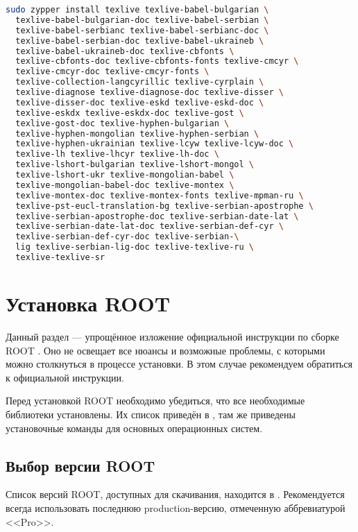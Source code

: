 \documentclass[12pt, a4paper, oneside, onecolumn]{book}
\newcommand{\ROOT}{\mbox{ROOT}}
\begin{document}
\begin{lstlisting}[language=bash]
sudo zypper install texlive texlive-babel-bulgarian \
  texlive-babel-bulgarian-doc texlive-babel-serbian \
  texlive-babel-serbianc texlive-babel-serbianc-doc \
  texlive-babel-serbian-doc texlive-babel-ukraineb \
  texlive-babel-ukraineb-doc texlive-cbfonts \
  texlive-cbfonts-doc texlive-cbfonts-fonts texlive-cmcyr \
  texlive-cmcyr-doc texlive-cmcyr-fonts \
  texlive-collection-langcyrillic texlive-cyrplain \
  texlive-diagnose texlive-diagnose-doc texlive-disser \
  texlive-disser-doc texlive-eskd texlive-eskd-doc \
  texlive-eskdx texlive-eskdx-doc texlive-gost \
  texlive-gost-doc texlive-hyphen-bulgarian \
  texlive-hyphen-mongolian texlive-hyphen-serbian \
  texlive-hyphen-ukrainian texlive-lcyw texlive-lcyw-doc \
  texlive-lh texlive-lhcyr texlive-lh-doc \
  texlive-lshort-bulgarian texlive-lshort-mongol \
  texlive-lshort-ukr texlive-mongolian-babel \
  texlive-mongolian-babel-doc texlive-montex \
  texlive-montex-doc texlive-montex-fonts texlive-mpman-ru \
  texlive-pst-eucl-translation-bg texlive-serbian-apostrophe \
  texlive-serbian-apostrophe-doc texlive-serbian-date-lat \
  texlive-serbian-date-lat-doc texlive-serbian-def-cyr \
  texlive-serbian-def-cyr-doc texlive-serbian-\
  lig texlive-serbian-lig-doc texlive-texlive-ru \
  texlive-texlive-sr
\end{lstlisting}

\section{Установка \ROOT{}}

Данный раздел --- упрощённое изложение официальной инструкции по сборке \ROOT{} \cite{RootBuild}. Оно не освещает все нюансы и возможные проблемы, с которыми можно столкнуться в процессе установки. В этом случае рекомендуем обратиться к официальной инструкции.

Перед установкой \ROOT{} необходимо убедиться, что все необходимые библиотеки установлены. Их  список приведён в \cite{RootPrerequisites}, там же приведены установочные команды для основных операционных систем.

\subsection{Выбор версии \ROOT{}}

Список версий \ROOT{}, доступных для скачивания, находится в \cite{RootDownload}. Рекомендуется всегда использовать последнюю  production-версию, отмеченную аббревиатурой <<Pro>>.
\end{document}
